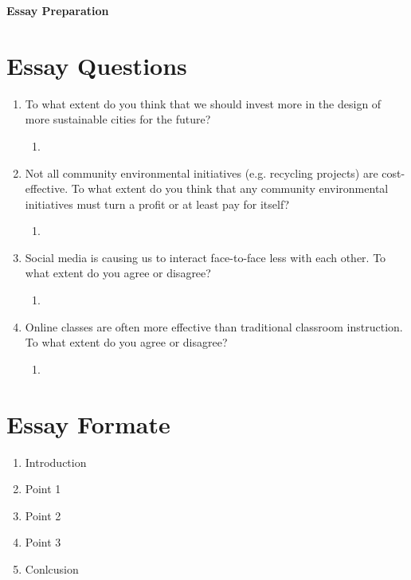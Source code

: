 \documentclass[11pt]{article}
\begin{document}
\begin{center}
\vspace{0.6cm}
{\Large \bf Essay Preparation}
\vspace{0.3cm}
\end{center}
\section{Essay Questions}
\begin{enumerate}


\item To what extent do you think that we should invest more in the design of more sustainable cities for the future?

\begin{enumerate}
    \item 
\end{enumerate}

\item Not all community environmental initiatives (e.g. recycling projects) are cost-effective. To what extent do you think that any community environmental initiatives must turn a profit or at least pay for itself?

\begin{enumerate}
    \item 
\end{enumerate}


\item Social media is causing us to interact face-to-face less with each other. To what extent do you agree or disagree?

\begin{enumerate}
    \item 
\end{enumerate}


\item Online classes are often more effective than traditional classroom instruction. To what extent do you agree or disagree?

\begin{enumerate}
    \item 
\end{enumerate}


\end{enumerate}
\section{Essay Formate}

\begin{enumerate}
    \item Introduction
    \item Point 1
    \item Point 2
    \item Point 3
    \item Conlcusion
\end{enumerate}
\end{document}
